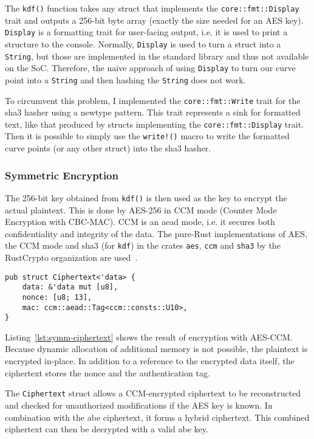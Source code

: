 The \verb+kdf()+ function takes any struct that implements the \texttt{core::fmt::Display} trait and outputs a 256-bit byte array (exactly the size needed for an AES key).
\texttt{Display} is a formatting trait for user-facing output, i.e. it is used to print a structure to the console.
Normally, \texttt{Display} is used to turn a struct into a \verb+String+, but those are implemented in the standard library and thus not available on the SoC.
Therefore, the naive approach of using \texttt{Display} to turn our curve point into a \texttt{String} and then hashing the \texttt{String} does not work.

To circumvent this problem, I implemented the \verb+core::fmt::Write+ trait for the \acrshort{sha3} hasher using a newtype pattern.
This trait represents a sink for formatted text, like that produced by structs implementing the \verb+core::fmt::Display+ trait.
Then it is possible to simply use the \verb+write!()+ macro to write the formatted curve points (or any other struct) into the \acrshort{sha3} hasher.

\subsubsection{Symmetric Encryption}

The 256-bit key obtained from \texttt{kdf()} is then used as the key to encrypt the actual plaintext.
This is done by AES-256 in CCM mode (Counter Mode Encryption with CBC-MAC).
CCM is an \acrshort{aead} mode, i.e. it secures both confidentiality and integrity of the data.
The pure-Rust implementations of AES, the CCM mode and \acrshort{sha3} (for \texttt{kdf}) in the crates \texttt{aes}, \texttt{ccm} and \texttt{sha3} by the RustCrypto organization are used~\cite{noauthor_rustcrypto_nodate}.

\begin{lstlisting}[float=h,caption={Symmetric Ciphertext struct},label={lst:symm-ciphertext}]
pub struct Ciphertext<'data> {
    data: &'data mut [u8],
    nonce: [u8; 13],
    mac: ccm::aead::Tag<ccm::consts::U10>,
}
\end{lstlisting}

Listing~\ref{lst:symm-ciphertext} shows the result of encryption with AES-CCM.
Because dynamic allocation of additional memory is not possible, the plaintext is encrypted in-place.
In addition to a reference to the encrypted data itself, the ciphertext stores the nonce and the authentication tag.

The \texttt{Ciphertext} struct allows a CCM-encrypted ciphertext to be reconstructed and checked for unauthorized modifications if the AES key is known.
In combination with the \acrshort{abe} ciphertext, it forms a hybrid ciphertext.
This combined ciphertext can then be decrypted with a valid \acrshort{abe} key.

